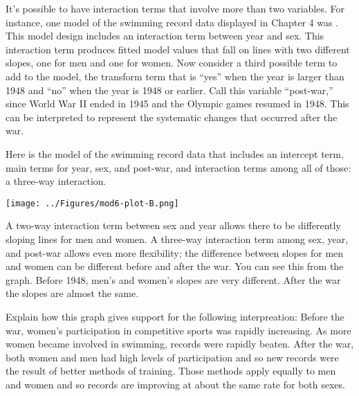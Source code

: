 
It's possible to have interaction terms that involve more than two
variables. For instance, one model of the swimming record data
displayed in Chapter 4 was .
This model design includes an interaction term between year and sex.
This interaction term produces fitted model values that fall on lines
with two different slopes, one for men and one for women.  Now
consider a third possible term to add to the model, the transform term
that is ``yes'' when the year is larger than 1948 and ``no'' when the
year is 1948 or earlier.  Call this variable ``post-war,'' since World
War II ended in 1945 and the Olympic games resumed in 1948.  This can
be interpreted to represent the systematic changes that occurred after
the war.


Here is the model of the swimming record data 
that includes an intercept term, main terms for year, sex, and
post-war, and interaction terms among all of those: a three-way interaction.

\bigskip
\centerline{\texttt{[image: ../Figures/mod6-plot-B.png]}}
\bigskip

A two-way interaction term between sex and year allows there to be
differently sloping lines for men and women.  A three-way
interaction term among sex, year, and post-war allows even more
flexibility; the difference between slopes for men and women can be
different before and after the war.  You can see this from the graph.
Before 1948, men's and women's slopes are very different.  After the
war the slopes are almost the same.  

Explain how this graph gives support for the following interpreation:
Before the war, women's participation in competitive sports was rapidly
increasing.  As more women became involved in swimming, records were
rapidly beaten.  After the war, both women and men had high levels of
participation and so new records were the result of better methods of
training.  Those methods apply equally to men and women and so records
are improving at about the same rate for both sexes.
\TextEntry

